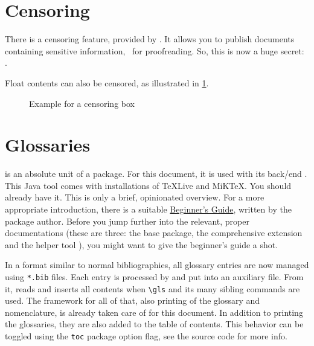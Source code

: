 \section{Censoring}

There is a censoring feature, provided by .
It allows you to publish documents containing sensitive information, \ for
proofreading.
So, this is now a huge
secret:
.

Float contents can also be censored, as illustrated in \cref{fig:censorbox}.
\begin{figure}[tbp]
    \centering
    \caption{Example for a censoring box}
    \label{fig:censorbox}
\end{figure}

\section{Glossaries}
\label{ch:glossaries}

 is an absolute unit of a package.
For this document, it is used with its back\-/end .
This Java tool comes with installations of TeXLive and MiKTeX.
You should already have it.
This  is only a brief, opinionated overview.
For a more appropriate introduction, there is a suitable
\href{http://tug.ctan.org/macros/latex/contrib/glossaries/glossariesbegin.pdf}{Beginner's Guide},
written by the package author.
Before you jump further into the relevant, proper documentations (these are three: the
 base package, the comprehensive extension
 and the helper tool ), you might
want to give the beginner's guide a shot.

In a format similar to normal bibliographies, all glossary entries are now managed
using \texttt{*.bib} files.
Each entry is processed by  and put into an auxiliary file.
From it,  reads and inserts all contents when \verb|\gls|
and its many sibling commands are used.
The framework for all of that, also printing of the glossary and nomenclature,
is already taken care of for this document.
In addition to printing the glossaries, they are also added to the table of contents.
This behavior can be toggled using the \texttt{toc} package option flag,
see the source code for more info.

